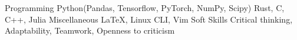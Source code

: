 

\begin{cvskills}

  \cvskill
    {Programming} %
    {Python(Pandas, Tensorflow, PyTorch, NumPy, Scipy)		Rust, C, C++, Julia} %
  \cvskill
    {Miscellaneous} %
    {\LaTeX, Linux CLI, Vim} %
  \cvskill
    {Soft Skills} %
    {Critical thinking, Adaptability, Teamwork, Openness to criticism} %

\end{cvskills}
